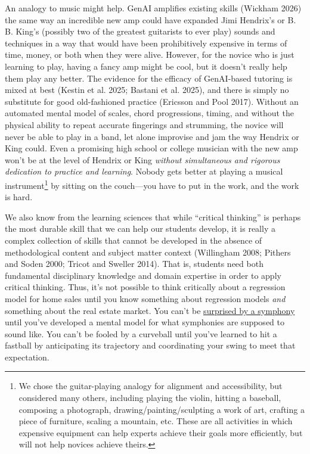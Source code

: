 \documentclass[
]{hdsr}
\begin{document}
An analogy to music might help. GenAI amplifies existing skills (Wickham
2026) the same way an incredible new amp could have expanded Jimi
Hendrix's or B. B. King's (possibly two of the greatest guitarists to
ever play) sounds and techniques in a way that would have been
prohibitively expensive in terms of time, money, or both when they were
alive. However, for the novice who is just learning to play, having a
fancy amp might be cool, but it doesn't really help them play any
better. The evidence for the efficacy of GenAI-based tutoring is mixed
at best (Kestin et al. 2025; Bastani et al. 2025), and there is simply
no substitute for good old-fashioned practice (Ericsson and Pool 2017).
Without an automated mental model of scales, chord progressions, timing,
and without the physical ability to repeat accurate fingerings and
strumming, the novice will never be able to play in a band, let alone
improvise and jam the way Hendrix or King could. Even a promising high
school or college musician with the new amp won't be at the level of
Hendrix or King \emph{without simultaneous and rigorous dedication to
practice and learning}. Nobody gets better at playing a musical
instrument\footnote{We chose the guitar-playing analogy for alignment
  and accessibility, but considered many others, including playing the
  violin, hitting a baseball, composing a photograph,
  drawing/painting/sculpting a work of art, crafting a piece of
  furniture, scaling a mountain, etc. These are all activities in which
  expensive equipment can help experts achieve their goals more
  efficiently, but will not help novices achieve theirs.} by sitting on
the couch---you have to put in the work, and the work is hard.

We also know from the learning sciences that while ``critical thinking''
is perhaps the most durable skill that we can help our students develop,
it is really a complex collection of skills that cannot be developed in
the absence of methodological content and subject matter context
(Willingham 2008; Pithers and Soden 2000; Tricot and Sweller 2014). That
is, students need both fundamental disciplinary knowledge and domain
expertise in order to apply critical thinking. Thus, it's not possible
to think critically about a regression model for home sales until you
know something about regression models \emph{and} something about the
real estate market. You can't be
\href{https://en.wikipedia.org/wiki/Symphony_No._94_(Haydn)}{surprised
by a symphony} until you've developed a mental model for what symphonies
are supposed to sound like. You can't be fooled by a curveball until
you've learned to hit a fastball by anticipating its trajectory and
coordinating your swing to meet that expectation.
\end{document}
